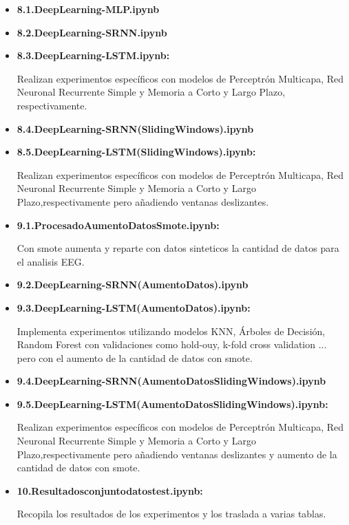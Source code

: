 \begin{itemize}
\begin{itemize}
   \item
    \textbf{8.1.DeepLearning-MLP.ipynb}
   \item
    \textbf{8.2.DeepLearning-SRNN.ipynb} 
   \item
    \textbf{8.3.DeepLearning-LSTM.ipynb:}      

    Realizan experimentos específicos con modelos de Perceptrón Multicapa, Red Neuronal Recurrente Simple y Memoria a Corto y Largo Plazo, respectivamente.
    
   \item
    \textbf{8.4.DeepLearning-SRNN(SlidingWindows).ipynb}
   \item
    \textbf{8.5.DeepLearning-LSTM(SlidingWindows).ipynb:}
    
    Realizan experimentos específicos con modelos de Perceptrón Multicapa, Red Neuronal Recurrente Simple y Memoria a Corto y Largo Plazo,respectivamente pero añadiendo ventanas deslizantes.
    
   \item
    \textbf{9.1.ProcesadoAumentoDatosSmote.ipynb:} 
    
    Con smote aumenta y reparte con datos sinteticos la cantidad de datos para el analisis EEG. 
    
   \item
    \textbf{9.2.DeepLearning-SRNN(AumentoDatos).ipynb}
   \item
    \textbf{9.3.DeepLearning-LSTM(AumentoDatos).ipynb:}
    
    Implementa experimentos utilizando modelos KNN, Árboles de Decisión, Random Forest con validaciones como hold-ouy, k-fold cross validation ... pero con el aumento de la cantidad de datos con smote.
    
   \item
    \textbf{9.4.DeepLearning-SRNN(AumentoDatosSlidingWindows).ipynb}
   \item
   \textbf{ 9.5.DeepLearning-LSTM(AumentoDatosSlidingWindows).ipynb:} 
    
    Realizan experimentos específicos con modelos de Perceptrón Multicapa, Red Neuronal Recurrente Simple y Memoria a Corto y Largo Plazo,respectivamente pero añadiendo ventanas deslizantes y aumento de la cantidad de datos con smote.
    
   \item
    \textbf{10.Resultadosconjuntodatostest.ipynb:} 
    
    Recopila los resultados de los experimentos y los traslada a varias tablas.
   \end{itemize} 
  \end{itemize} 
  
